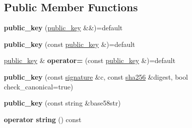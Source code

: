 \subsection*{Public Member Functions}
\begin{DoxyCompactItemize}
\item 
\mbox{\label{classfc_1_1crypto_1_1public__key_a5385137e6d97351a2ac617c39d2776ce}} 
{\bfseries public\+\_\+key} (\mbox{\hyperlink{classfc_1_1crypto_1_1public__key}{public\+\_\+key}} \&\&)=default
\item 
\mbox{\label{classfc_1_1crypto_1_1public__key_a2e7deb272ee68924b25fc8bd9beb84f5}} 
{\bfseries public\+\_\+key} (const \mbox{\hyperlink{classfc_1_1crypto_1_1public__key}{public\+\_\+key}} \&)=default
\item 
\mbox{\label{classfc_1_1crypto_1_1public__key_a27607463501ce74e2c610cf7bf5b1537}} 
\mbox{\hyperlink{classfc_1_1crypto_1_1public__key}{public\+\_\+key}} \& {\bfseries operator=} (const \mbox{\hyperlink{classfc_1_1crypto_1_1public__key}{public\+\_\+key}} \&)=default
\item 
\mbox{\label{classfc_1_1crypto_1_1public__key_a89204089b54b5e1a364250809b6325ee}} 
{\bfseries public\+\_\+key} (const \mbox{\hyperlink{classfc_1_1crypto_1_1signature}{signature}} \&c, const \mbox{\hyperlink{classfc_1_1sha256}{sha256}} \&digest, bool check\+\_\+canonical=true)
\item 
\mbox{\label{classfc_1_1crypto_1_1public__key_af79fc7adbc6d4df77b422baf5df600aa}} 
{\bfseries public\+\_\+key} (const string \&base58str)
\item 
\mbox{\label{classfc_1_1crypto_1_1public__key_a17ffa06020981f2ea30e7548284803ff}} 
{\bfseries operator string} () const
\end{DoxyCompactItemize}
